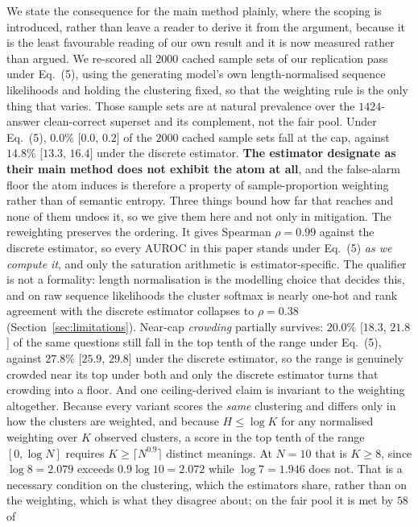 We state the consequence for the main method plainly, where the scoping is introduced,
rather than leave a reader to derive it from the argument, because it is the least
favourable reading of our own result and it is now measured rather than argued. We re-scored
all $2000$ cached sample sets of our replication pass under Eq.~(5), using the generating
model's own length-normalised sequence likelihoods and holding the clustering fixed, so that
the weighting rule is the only thing that varies. Those sample sets are at natural prevalence
over the $1424$-answer clean-correct superset and its complement, not the fair pool. Under
Eq.~(5), $0.0\%$ [$0.0$, $0.2$] of the $2000$ cached sample sets fall at the cap, against
$14.8\%$ [$13.3$, $16.4$] under the discrete estimator. \textbf{The estimator
\citet{farquhar2024detecting} designate as their main method does not exhibit the atom at
all}, and the false-alarm floor the atom induces is therefore a property of sample-proportion
weighting rather than of semantic entropy. Three things bound how far that reaches and none
of them undoes it, so we give them here and not only in mitigation. The reweighting preserves
the ordering. It gives Spearman $\rho{=}0.99$ against the discrete estimator, so every AUROC
in this paper stands under Eq.~(5) \emph{as we compute it}, and only the saturation
arithmetic is estimator-specific. The qualifier is not a formality: length normalisation is
the modelling choice that decides this, and on raw sequence likelihoods the cluster softmax
is nearly one-hot and rank agreement with the discrete estimator collapses to
$\rho{=}0.38$ (Section~\ref{sec:limitations}).
Near-cap \emph{crowding} partially survives: $20.0\%$ [$18.3$, $21.8$] of the same questions
still fall in the top tenth of the range under Eq.~(5), against $27.8\%$ [$25.9$, $29.8$]
under the discrete estimator, so the range is genuinely crowded near its top under both and
only the discrete estimator turns that crowding into a floor. And one ceiling-derived claim
is invariant to the weighting altogether. Because every variant scores the \emph{same}
clustering and differs only in how the clusters are weighted, and because $H \leq \log K$ for
any normalised weighting over $K$ observed clusters, a score in the top tenth of the range
$[0, \log N]$ requires $K \geq \lceil N^{0.9} \rceil$ distinct meanings. At $N{=}10$ that is
$K \geq 8$, since $\log 8 = 2.079$ exceeds $0.9 \log 10 = 2.072$ while $\log 7 = 1.946$ does
not. That is a necessary condition on the clustering, which the estimators share, rather than
on the weighting, which is what they disagree about; on the fair pool it is met by $58$ of
